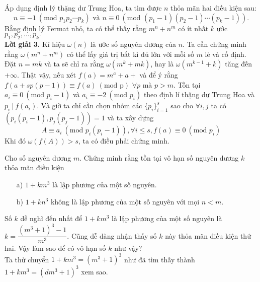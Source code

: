 \begin{bt}
{		Áp dụng định lý thặng dư Trung Hoa, ta tìm được $n$ thỏa mãn hai điều kiện sau: \[n \equiv -1 ~(\textrm{mod } p_1p_2 \cdots p_k) \textrm{ và  } n \equiv 0 ~ (\textrm{mod } (p_1-1)(p_2-1) \cdots (p_k-1) ).\]
		Bằng định lý Fermat nhỏ, ta có thể thấy rằng $m^n+n^m$ có ít nhất $k$ ước $p_1, p_2, \dots, p_k.$ \\
		\textbf{Lời giải 3.} Kí hiệu $\omega (n)$ là ước số nguyên dương của $n$. Ta cần chứng minh rằng $\omega (m^n+n^m)$ có thể lấy giá trị bất kì đủ lớn với mỗi số $m$ lẻ và cố định. \\
		Đặt $n=mk$ và ta sẽ chỉ ra rằng $\omega (m^k +mk)$, hay là $\omega (m^{k-1}+k)$ tăng đến $+\infty$. Thật vậy, nếu xét $f(a) = m^a+a+$ và để ý rằng $f(a+sp(p-1)) \equiv f(a) ~ (\textrm{mod p})$ $\forall p$ mà $p>m$. Tồn tại $a_i \equiv 0 ~  (\textrm{mod }p_i-1)$  và $a_i \equiv -2  ~(\textrm{mod }p_i)$ theo định lí thặng dư Trung Hoa và $p_i ~|~ f(a_i)$. Và giờ ta chỉ cần chọn nhóm các $\{p_i\}^s_{i=1}$ sao cho $\forall i,j$ ta có $(p_i (p_i-1),p_j(p_j-1)) =1$ và ta xây dựng \[A \equiv a_i~ (\textrm{mod } p_i(p_i-1)), \forall i \leqslant s, f(a) \equiv 0 ~  (\textrm{mod } p_i )\]
		Khi đó $\omega(f(A)) >s$, ta có điều phải chứng minh.
	}
	
\end{bt}

\begin{bt}%
	Cho số nguyên dương $m$. Chứng minh rằng tồn tại vô hạn số nguyên dương $k$ thỏa mãn điều kiện
	\begin{enumerate}
		\item[a)] $1+km^3$ là lập phương của một số nguyên.
		\item[b)] $1+kn^3$ không là lập phương của một số nguyên với mọi $n<m$. 
	\end{enumerate} 
	Số $k$ dễ nghĩ đến nhất để $1+km^3$ là lập phương của một số nguyên là $k=\dfrac{(m^3+1)^3 -1}{m^3}$. Cũng dễ dàng nhận thấy số $k$ này thỏa mãn điều kiện thứ hai. Vậy làm sao để có vô hạn số $k$ như vậy? \\
	Ta thử chuyển $1+km^3 = (m^3+1)^3$ như đã tìm thấy thành $1+km^3 = (dm^3+1)^3$ xem sao. 
\end{bt}

